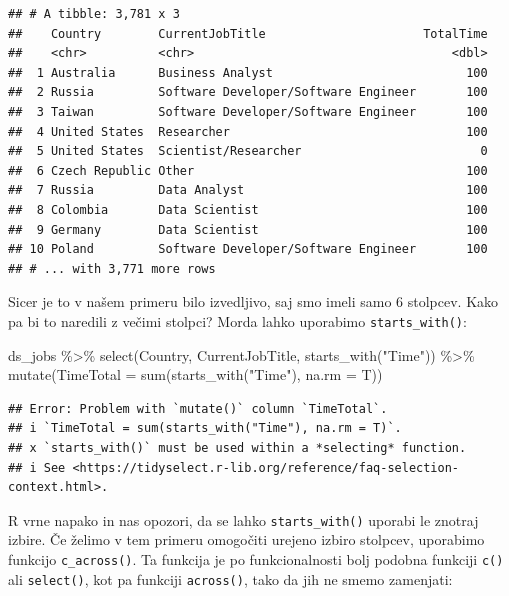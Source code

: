 \documentclass[
]{book}
\newenvironment{Shaded}{\begin{snugshade}}{\end{snugshade}}
\newcommand{\AttributeTok}[1]{\textcolor[rgb]{0.77,0.63,0.00}{#1}}
\newcommand{\FunctionTok}[1]{\textcolor[rgb]{0.00,0.00,0.00}{#1}}
\newcommand{\NormalTok}[1]{#1}
\newcommand{\SpecialCharTok}[1]{\textcolor[rgb]{0.00,0.00,0.00}{#1}}
\newcommand{\StringTok}[1]{\textcolor[rgb]{0.31,0.60,0.02}{#1}}
\begin{document}
\begin{verbatim}
## # A tibble: 3,781 x 3
##    Country        CurrentJobTitle                      TotalTime
##    <chr>          <chr>                                    <dbl>
##  1 Australia      Business Analyst                           100
##  2 Russia         Software Developer/Software Engineer       100
##  3 Taiwan         Software Developer/Software Engineer       100
##  4 United States  Researcher                                 100
##  5 United States  Scientist/Researcher                         0
##  6 Czech Republic Other                                      100
##  7 Russia         Data Analyst                               100
##  8 Colombia       Data Scientist                             100
##  9 Germany        Data Scientist                             100
## 10 Poland         Software Developer/Software Engineer       100
## # ... with 3,771 more rows
\end{verbatim}

Sicer je to v našem primeru bilo izvedljivo, saj smo imeli samo 6 stolpcev. Kako pa bi to naredili z večimi stolpci? Morda lahko uporabimo \texttt{starts\_with()}:

\begin{Shaded}
\begin{Highlighting}[]
\NormalTok{ds\_jobs }\SpecialCharTok{\%\textgreater{}\%}
  \FunctionTok{select}\NormalTok{(Country, CurrentJobTitle, }\FunctionTok{starts\_with}\NormalTok{(}\StringTok{"Time"}\NormalTok{)) }\SpecialCharTok{\%\textgreater{}\%}
  \FunctionTok{mutate}\NormalTok{(}\AttributeTok{TimeTotal =} \FunctionTok{sum}\NormalTok{(}\FunctionTok{starts\_with}\NormalTok{(}\StringTok{"Time"}\NormalTok{), }\AttributeTok{na.rm =}\NormalTok{ T))}
\end{Highlighting}
\end{Shaded}

\begin{verbatim}
## Error: Problem with `mutate()` column `TimeTotal`.
## i `TimeTotal = sum(starts_with("Time"), na.rm = T)`.
## x `starts_with()` must be used within a *selecting* function.
## i See <https://tidyselect.r-lib.org/reference/faq-selection-context.html>.
\end{verbatim}

R vrne napako in nas opozori, da se lahko \texttt{starts\_with()} uporabi le znotraj izbire. Če želimo v tem primeru omogočiti urejeno izbiro stolpcev, uporabimo funkcijo \texttt{c\_across()}. Ta funkcija je po funkcionalnosti bolj podobna funkciji \texttt{c()} ali \texttt{select()}, kot pa funkciji \texttt{across()}, tako da jih ne smemo zamenjati:
\end{document}
